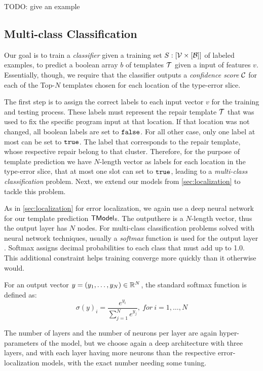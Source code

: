 TODO: give an example


\subsection{Multi-class Classification}
\label{subsec:multi-class}
Our goal is to train a \emph{classifier} given a training set $S : [\mathcal{V}
\times [\mathcal{B}]]$ of labeled examples, to predict a boolean array $b$ of
templates $\mathcal{T}$ given a input of features $v$. Essentially, though, we require
that the classifier outputs a \emph{confidence score} $\mathcal{C}$ for each of the
Top-$N$ templates chosen for each location of the type-error slice.

The first step is to assign the correct labels to each input vector $v$ for the
training and testing process. These labels must represent the repair template
$\mathcal{T}$ that was used to fix the specific program input at that location. If that
location was not changed, all boolean labels are set to $\mathtt{false}$. For all other
case, only one label at most can be set to $\mathtt{true}$. The label that corresponds
to the repair template, whose respective repair belong to that cluster.
Therefore, for the purpose of template prediction we have $N$-length vector as
labels for each location in the type-error slice, that at most one slot can set
to $\mathtt{true}$, leading to a \emph{multi-class classification} problem. Next, we
extend our models from \autoref{sec:localization} to tackle this problem.

As in \autoref{sec:localization} for error localization, we again use a deep
neural network for our template prediction $\mathsf{TModel}$s. The outputhere is a
$N$-length vector, thus the output layer has $N$ nodes. For multi-class
classification problems solved with neural network techniques, usually a
\emph{softmax} function is used for the output layer
\citep[][]{Goodfellow-et-al-2016, Bishop-book-2006}. Softmax assigns decimal
probabilities to each class that must add up to 1.0. This additional constraint
helps training converge more quickly than it otherwise would.

For an output vector $y = (y_1, \dots, y_N) \in \mathbb{R}^{N}$, the standard softmax
function is defined as:
\[ \sigma(y)_i = \frac{e^{y_i}}{\sum_{j=1}^{N} e^{y_j}},\ for\ i = 1, \dots, N \]

The number of layers and the number of neurons per layer are again
hyper-parameters of the model, but we choose again a deep architecture with
three layers, and with each layer having more neurons than the respective
error-localization models, with the exact number needing some tuning.

